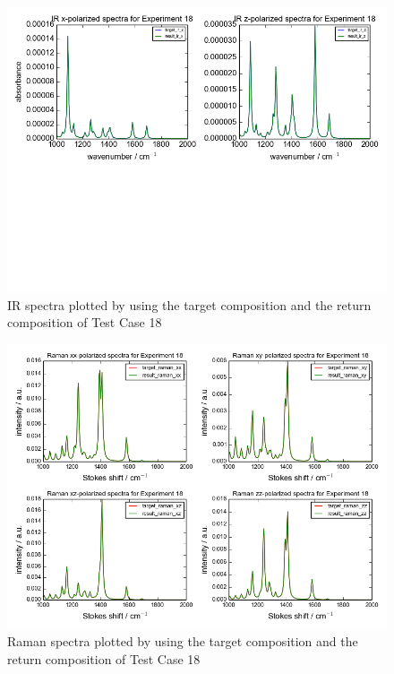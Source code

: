 \begin{figure}[!ht] 
\centering
\includegraphics[scale=0.7]{Figures/chapter4_result_target_plotting_500datapoint_ir.png}
\caption{IR spectra plotted by using the target composition and the return composition of Test Case 18} \label{fig:4.5}
\end{figure}

\begin{figure}[!ht] 
\centering
\includegraphics[scale=0.7]{Figures/chapter4_result_target_plotting_500datapoint_raman.png}
\caption{Raman spectra plotted by using the target composition and the return composition of Test Case 18} \label{fig:4.6}
\end{figure}

